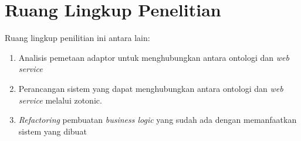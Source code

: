 \section{Ruang Lingkup Penelitian}

Ruang lingkup penilitian ini antara lain:
\begin{enumerate}
\item Analisis pemetaan adaptor untuk menghubungkan antara ontologi dan \textit{web service}
\item Perancangan sistem yang dapat menghubungkan antara ontologi dan \textit{web service} melalui zotonic.
\item \textit{Refactoring} pembuatan \textit{business logic} yang sudah ada dengan memanfaatkan sistem yang dibuat
\end{enumerate}

